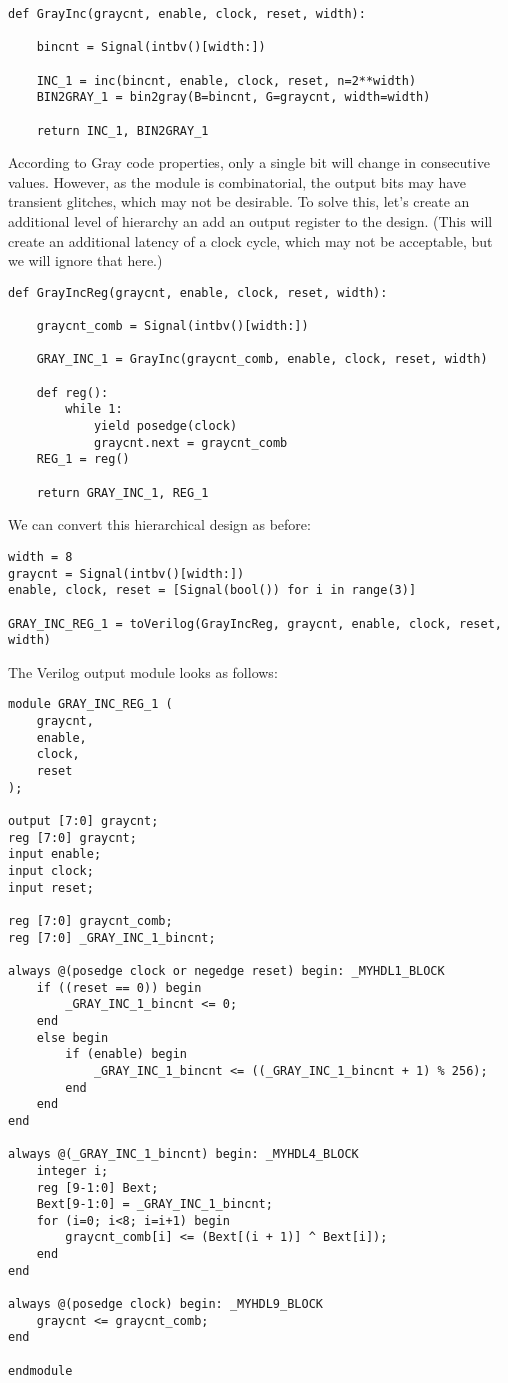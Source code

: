 \begin{verbatim}
def GrayInc(graycnt, enable, clock, reset, width):
    
    bincnt = Signal(intbv()[width:])
    
    INC_1 = inc(bincnt, enable, clock, reset, n=2**width)
    BIN2GRAY_1 = bin2gray(B=bincnt, G=graycnt, width=width)
    
    return INC_1, BIN2GRAY_1
\end{verbatim}

According to Gray code properties, only a single bit
will change in consecutive values. However, as the
 module is combinatorial, the output bits
may have transient glitches, which may not be desirable.
To solve this, let's create an additional level of
hierarchy an add an output register to the design.
(This will create an additional latency of a clock
cycle, which may not be acceptable, but we will
ignore that here.)

\begin{verbatim}
def GrayIncReg(graycnt, enable, clock, reset, width):
    
    graycnt_comb = Signal(intbv()[width:])
    
    GRAY_INC_1 = GrayInc(graycnt_comb, enable, clock, reset, width)
    
    def reg():
        while 1:
            yield posedge(clock)
            graycnt.next = graycnt_comb
    REG_1 = reg()
    
    return GRAY_INC_1, REG_1
\end{verbatim}

We can convert this hierarchical design as before:

\begin{verbatim}
width = 8
graycnt = Signal(intbv()[width:])
enable, clock, reset = [Signal(bool()) for i in range(3)]

GRAY_INC_REG_1 = toVerilog(GrayIncReg, graycnt, enable, clock, reset, width)
\end{verbatim}

The Verilog output module looks as follows:

\begin{verbatim}
module GRAY_INC_REG_1 (
    graycnt,
    enable,
    clock,
    reset
);

output [7:0] graycnt;
reg [7:0] graycnt;
input enable;
input clock;
input reset;

reg [7:0] graycnt_comb;
reg [7:0] _GRAY_INC_1_bincnt;

always @(posedge clock or negedge reset) begin: _MYHDL1_BLOCK
    if ((reset == 0)) begin
        _GRAY_INC_1_bincnt <= 0;
    end
    else begin
        if (enable) begin
            _GRAY_INC_1_bincnt <= ((_GRAY_INC_1_bincnt + 1) % 256);
        end
    end
end

always @(_GRAY_INC_1_bincnt) begin: _MYHDL4_BLOCK
    integer i;
    reg [9-1:0] Bext;
    Bext[9-1:0] = _GRAY_INC_1_bincnt;
    for (i=0; i<8; i=i+1) begin
        graycnt_comb[i] <= (Bext[(i + 1)] ^ Bext[i]);
    end
end

always @(posedge clock) begin: _MYHDL9_BLOCK
    graycnt <= graycnt_comb;
end

endmodule
\end{verbatim}

